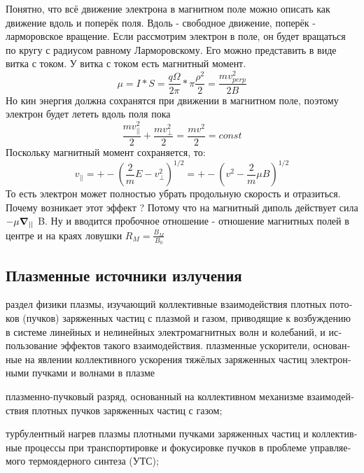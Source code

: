 \documentclass[10pt, a4paper]{article}
\begin{document}
Понятно, что всё движение электрона в магнитном поле можно описать как движение вдоль и поперёк поля. Вдоль - свободное движение, поперёк - ларморовское вращение.
Если рассмотрим электрон в поле, он будет вращаться по кругу с радиусом равному Ларморовскому. Его можно представить в виде витка с током. У витка с током есть магнитный момент.
\begin{equation}
	\label{eq.Disp14.1.9}
 \mu=I*S=\frac{q\Omega}{2\pi} * \pi \frac{\rho^{2}}{2}=\frac{mv_{perp}^{2}}{2B}
\end{equation}	
Но кин энергия должна сохранятся при движении в магнитном поле, поэтому электрон будет лететь вдоль поля пока
\begin{equation}
	\label{eq.Disp14.1.10}
	\frac{mv_{||}^{2}}{2}+\frac{mv_{\perp}^{2}}{2}=\frac{mv^{2}}{2}=const
\end{equation}	
Поскольку магнитный момент сохраняется, то:
\begin{equation}
	\label{eq.Disp14.1.11}
 v_{||}=+-(\frac{2}{m}E-v_{\perp}^{2})^{1/2}=+-(v^{2}-\frac{2}{m} \mu B)^{1/2}
\end{equation}	
То есть электрон может полностью убрать продольную скорость и отразиться. Почему возникает этот эффект ? Потому что на магнитный диполь действует сила $-\mu \grad_{||}$ B. Ну и вводится пробочное отношение - отношение магнитных полей в центре и на краях ловушки $R_M=\frac{B_M}{B_0}$


\subsection{Плазменные источники излучения}
\label{14.4} 
раз­дел фи­зи­ки плаз­мы, изу­чаю­щий кол­лек­тив­ные взаи­мо­дей­ст­вия плот­ных по­то­ков (пуч­ков) за­ря­жен­ных час­тиц с плаз­мой и га­зом, при­во­дя­щие к воз­бу­ж­де­нию в сис­те­ме ли­ней­ных и не­ли­ней­ных элек­тро­маг­нит­ных волн и ко­ле­ба­ний, и ис­поль­зо­ва­ние эф­фек­тов та­ко­го взаи­мо­дей­ст­вия.
плаз­мен­ные ус­ко­ри­те­ли, ос­но­ван­ные на яв­ле­нии кол­лек­тив­но­го ус­ко­ре­ния тя­жё­лых за­ря­жен­ных час­тиц элек­трон­ны­ми пуч­ка­ми и вол­на­ми в плаз­ме

плаз­мен­но-пуч­ко­вый раз­ряд, ос­но­ван­ный на кол­лек­тив­ном ме­ха­низ­ме взаи­мо­дей­ст­вия плот­ных пуч­ков за­ря­жен­ных час­тиц с га­зом;

тур­бу­лент­ный на­грев плаз­мы плот­ны­ми пуч­ка­ми за­ря­жен­ных час­тиц и кол­лек­тив­ные про­цес­сы при транс­пор­ти­ров­ке и фо­ку­си­ров­ке пуч­ков в про­бле­ме управ­ляе­мо­го тер­мо­ядер­но­го син­те­за (УТС);
\end{document}
